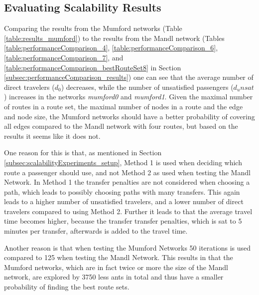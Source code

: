 \subsection{Evaluating Scalability Results}

Comparing the results from the Mumford networks (Table \vref{table:results_mumford}) to the results from the Mandl network (Tables \ref{table:performanceComparison_4}, \ref{table:performanceComparison_6}, \ref{table:performanceComparison_7}, and \ref{table:performanceComparison_bestRouteSet8} in Section \vref{subsec:performanceComparison_results}) one can see that the average number of direct travelers ($d_0$) decreases, while the number of unsatisfied passengers ($d_unsat$) increases in the networks \textit{mumford0} and \textit{mumford1}. Given the maximal number of routes in a route set, the maximal number of nodes in a route and the edge and node size, the Mumford networks should have a better probability of covering all edges compared to the Mandl network with four routes, but based on the results it seems like it does not. 

One reason for this is that, as mentioned in Section \vref{subsec:scalabilityExperiments_setup}, Method 1 is used when deciding which route a passenger should use, and not Method 2 as used when testing the Mandl Network. In Method 1 the transfer penalties are not considered when choosing a path, which leads to possibly choosing paths with many transfers. This again leads to a higher number of unsatisfied travelers, and a lower number of direct travelers compared to using Method 2. Further it leads to that the average travel time becomes higher, because the transfer transfer penalties, which is sat to 5 minutes per transfer, afterwards is added to the travel time. 

Another reason is that when testing the Mumford Networks 50 iterations is used compared to 125 when testing the Mandl Network. This results in that the Mumford networks, which are in fact twice or more the size of the Mandl network, are explored by 3750 less ants in total and thus have a smaller probability of finding the best route sets.  

